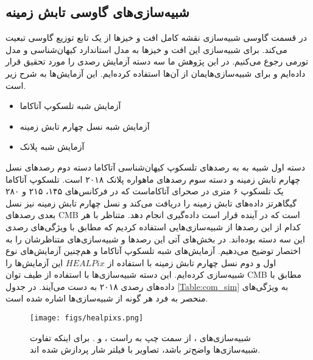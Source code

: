 \subsection{شبیه‌سازی‌های گاوسی تابش زمینه}
\label{sec:cmb_sims}
 در قسمت گاوسی شبیه‌سازی نقشه کامل افت و خیزها از یک تابع توزیع گاوسی تبعیت می‌کند. برای شبیه‌سازی این افت و خیزها به مدل استاندارد کیهان‌شناسی و مدل تورمی رجوع می‌کنیم. در این پژوهش ما سه دسته آزمایش رصدی را مورد تحقیق قرار داده‌ایم و برای شبیه‌‌سازی‌هایمان از آن‌ها استفاده کرده‌ایم. این آزمایش‌ها به شرح زیر است. 
 \begin{itemize}
 	\item آزمایش شبه تلسکوپ آتاکاما
 	\cite{aiola2020atacama}
 	
	 \item آزمایش شبه نسل چهارم تابش زمینه 
 	\cite{abazajian2016cmb}
 	
    \item آزمایش شبه پلانک 
 \end{itemize}
 دسته اول شبیه به به رصدهای تلسکوپ کیهان‌شناسی آتاکاما 
  دسته دوم  رصدهای نسل چهارم تابش زمینه	و دسته سوم رصدهای ماهواره پلانک ۲۰۱۸ است. تلسکوپ آتاکاما یک تلسکوپ ۶ متری در صحرای آتاکاماست که در فرکانس‌های ۱۴۵، ۲۱۵ و ۲۸۰ گیگاهرتز داده‌های تابش زمینه را دریافت می‌کند و نسل چهارم تابش زمینه نیز نسل بعدی رصدهای CMB است که در آینده قرار است داده‌گیری انجام دهد.  
متناظر با هر کدام از این رصدها از شبیه‌سازی‌هایی استفاده کردیم که مطابق با ویژگی‌های رصدی این سه دسته بوده‌اند. در بخش‌های آتی این رصدها و شبیه‌سازی‌های متناظرشان را به اختصار توضیح می‌دهیم.
آزمایش‌های شبه تلسکوپ آتاکاما و هم‌چنین آزمایش‌های نوع اول و دوم نسل چهارم تابش زمینه با استفاده از $HEALPix$
 این آزمایش‌ها را شبیه‌سازی کرده‌ایم. این دسته شبیه‌سازی‌ها با استفاده از طیف توان CMB مطابق با داده‌های رصدی ۲۰۱۸ به دست می‌آیند. 
 در جدول 
\ref{Table:com_sim}
 به ویژگی‌های منحصر به فرد هر گونه از شبیه‌سازی‌ها اشاره شده است.
 
  \begin{figure}
 	\begin{center}
 		\texttt{[image: figs/healpixs.png]}
 	\end{center}
 	\caption{ 
 		شبیه‌سازی‌های
 		، از سمت چپ به راست
 		 ،   و 
 		. برای اینکه تفاوت شبیه‌سازی‌ها واضح‌تر باشد، تصاویر با فیلتر شار پردازش شده اند. 
 	}
 	\label{fig:healpix}
 \end{figure}

